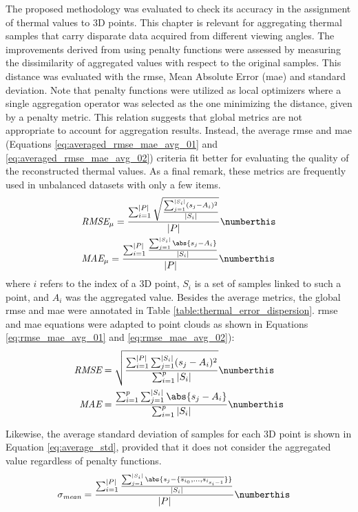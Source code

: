The proposed methodology was evaluated to check its accuracy in the assignment of thermal values to 3D points. This chapter is relevant for aggregating thermal samples that carry disparate data acquired from different viewing angles. The improvements derived from using penalty functions were assessed by measuring the dissimilarity of aggregated values with respect to the original samples. This distance was evaluated with the \acrshort{rmse}, Mean Absolute Error (\acrshort{mae}) and standard deviation. Note that penalty functions were utilized as local optimizers where a single aggregation operator was selected as the one minimizing the distance, given by a penalty metric. This relation suggests that global metrics are not appropriate to account for aggregation results. Instead, the average \acrshort{rmse} and \acrshort{mae} (Equations \ref{eq:averaged_rmse_mae_avg_01} and \ref{eq:averaged_rmse_mae_avg_02}) criteria fit better for evaluating the quality of the reconstructed thermal values. As a final remark, these metrics are frequently used in unbalanced datasets with only a few items.
\begin{align*}
    &\textit{RMSE}_{\mu} = \frac{\sum_{i=1}^{|P|} \sqrt{\frac{\sum_{j=1}^{|S_i|} (s_j - A_i)^2}{|S_i|}}}{|P|}
    \numberthis \label{eq:averaged_rmse_mae_avg_01}\\
    &\textit{MAE}_{\mu} = \frac{\sum_{i=1}^{|P|} \frac{\sum_{j=1}^{|S_i|} \abs{s_j - A_i}}{|S_i|}}{|P|}
    \numberthis \label{eq:averaged_rmse_mae_avg_02}
\end{align*}
where $i$ refers to the index of a 3D point, $S_i$ is a set of samples linked to such a point, and $A_i$ was the aggregated value. Besides the average metrics, the global \acrshort{rmse} and \acrshort{mae} were annotated in Table \ref{table:thermal_error_dispersion}. \acrshort{rmse} and \acrshort{mae} equations were adapted to point clouds as shown in Equations \ref{eq:rmse_mae_avg_01} and \ref{eq:rmse_mae_avg_02}):
\begin{align*}
    \textit{RMSE} &= \sqrt{\frac{\sum_{i=1}^{|P|} \sum_{j=1}^{|S_i|} (s_j - A_i)^2}{\sum_{i=1}^{p} |S_i|}}
    \numberthis \label{eq:rmse_mae_avg_01}\\
    \textit{MAE} &= \frac{\sum_{i=1}^{p} \sum_{j=1}^{|S_i|} \abs{s_j - A_i}}{\sum_{i=1}^{p} |S_i|}
    \numberthis \label{eq:rmse_mae_avg_02}
\end{align*}

Likewise, the average standard deviation of samples for each 3D point is shown in Equation \ref{eq:average_std}, provided that it does not consider the aggregated value regardless of penalty functions. 
\begin{align*}
    &\sigma_{\textit{mean}} = \frac{\sum_{i=1}^{|P|} \frac{\sum_{j=1}^{|S_i|} \abs{s_j - \{\overline{s_{i_0},...,s_{i_{s_i-1}}}\}}}{|S_i|}}{|P|} 
    \numberthis \label{eq:average_std}
\end{align*}

